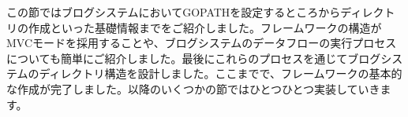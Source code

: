 この節ではブログシステムにおいてGOPATHを設定するところからディレクトリの作成といった基礎情報までをご紹介しました。フレームワークの構造がMVCモードを採用することや、ブログシステムのデータフローの実行プロセスについても簡単にご紹介しました。最後にこれらのプロセスを通じてブログシステムのディレクトリ構造を設計しました。ここまでで、フレームワークの基本的な作成が完了しました。以降のいくつかの節ではひとつひとつ実装していきます。
